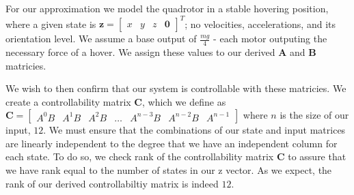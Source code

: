 \documentclass{article}
\begin{document}
\begin{multicols}{2}

For our approximation we model the quadrotor in a stable hovering position, where a given state is $\boldsymbol{z}=\begin{bmatrix} x & y & z & \boldsymbol{0}\end{bmatrix}^T$; no velocities, accelerations, and its orientation level. We assume a base output of $\frac{mg}{4}$ - each motor outputing the necessary force of a hover. We assign these values to our derived $\boldsymbol{A}$ and $\boldsymbol{B}$ matricies.

We wish to then confirm that our system is controllable with these matricies. We create a controllability matrix $\boldsymbol{C}$, which we define as $\boldsymbol{C} = \begin{bmatrix} A^0B & A^1B & A^2B & \dots & A^{n-3}B & A^{n-2}B & A^{n-1}\end{bmatrix}$ where $n$ is the size of our input, $12$. We must ensure that the combinations of our state and input matrices are linearly independent to the degree that we have an independent column for each state. To do so, we check rank of the controllability matrix $\boldsymbol{C}$ to assure that we have rank equal to the number of states in our z vector. As we expect, the rank of our derived controllabiltiy matrix is indeed $12$.


\end{multicols}
\end{document}
